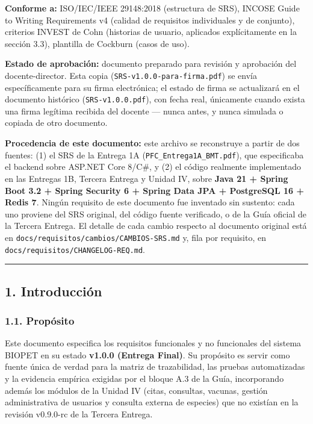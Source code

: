 \documentclass[
  spanish,
]{article}
\begin{document}
\textbf{Conforme a:} ISO/IEC/IEEE 29148:2018 (estructura de SRS), INCOSE
Guide to Writing Requirements v4 (calidad de requisitos individuales y
de conjunto), criterios INVEST de Cohn (historias de usuario, aplicados
explícitamente en la sección 3.3), plantilla de Cockburn (casos de uso).

\textbf{Estado de aprobación:} documento preparado para revisión y
aprobación del docente-director. Esta copia
(\texttt{SRS-v1.0.0-para-firma.pdf}) se envía específicamente para su
firma electrónica; el estado de firma se actualizará en el documento
histórico (\texttt{SRS-v1.0.0.pdf}), con fecha real, únicamente cuando
exista una firma legítima recibida del docente --- nunca antes, y nunca
simulada o copiada de otro documento.

\textbf{Procedencia de este documento:} este archivo se reconstruye a
partir de dos fuentes: (1) el SRS de la Entrega 1A
(\texttt{PFC\_\allowbreak{}Entrega1\allowbreak{}A\_\allowbreak{}BMT.\allowbreak{}pdf}), que especificaba el backend sobre
ASP.NET Core 8/C\#, y (2) el código realmente implementado en las
Entregas 1B, Tercera Entrega y Unidad IV, sobre \textbf{Java 21 + Spring
Boot 3.2 + Spring Security 6 + Spring Data JPA + PostgreSQL 16 + Redis
7}. Ningún requisito de este documento fue inventado sin sustento: cada
uno proviene del SRS original, del código fuente verificado, o de la
Guía oficial de la Tercera Entrega. El detalle de cada cambio respecto
al documento original está en
\texttt{docs/\allowbreak{}requisitos/\allowbreak{}cambios/\allowbreak{}CAMBIOS-\allowbreak{}SRS.\allowbreak{}md} y, fila por requisito,
en \texttt{docs/\allowbreak{}requisitos/\allowbreak{}CHANGELOG-\allowbreak{}REQ.\allowbreak{}md}.

\begin{center}\rule{0.5\linewidth}{0.5pt}\end{center}

\subsection{1. Introducción}\label{introducciuxf3n}

\subsubsection{1.1. Propósito}\label{propuxf3sito}

Este documento especifica los requisitos funcionales y no funcionales
del sistema BIOPET en su estado \textbf{v1.0.0 (Entrega Final)}. Su
propósito es servir como fuente única de verdad para la matriz de
trazabilidad, las pruebas automatizadas y la evidencia empírica exigidas
por el bloque A.3 de la Guía, incorporando además los módulos de la
Unidad IV (citas, consultas, vacunas, gestión administrativa de usuarios
y consulta externa de especies) que no existían en la revisión v0.9.0-rc
de la Tercera Entrega.
\end{document}
